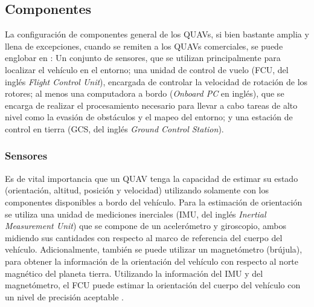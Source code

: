 \subsection{Componentes}

La configuración de componentes general de los QUAVs, si bien bastante amplia y llena de excepciones, cuando se remiten a los QUAVs comerciales, se puede englobar en \cite{multidrone2017review}: Un conjunto de sensores, que se utilizan principalmente para localizar el vehículo en el entorno; una unidad de control de vuelo (FCU, del inglés \textit{Flight Control Unit}), encargada de controlar la velocidad de rotación de los rotores; al menos una computadora a bordo (\textit{Onboard PC} en inglés), que se encarga de realizar el procesamiento necesario para llevar a cabo tareas de alto nivel como la evasión de obstáculos y el mapeo del entorno; y una estación de control en tierra (GCS, del inglés \textit{Ground Control Station}).

\subsubsection{Sensores}
\label{sec:QUAV-sensors}

Es de vital importancia que un QUAV tenga la capacidad de estimar su estado (orientación, altitud, posición y velocidad) utilizando solamente con los componentes disponibles a bordo del vehículo. Para la estimación de orientación se utiliza una unidad de mediciones inerciales \cite{multidrone2017review} (IMU, del inglés \textit{Inertial Measurement Unit}) que se compone de un acelerómetro y giroscopio, ambos midiendo sus cantidades con respecto al marco de referencia del cuerpo del vehículo. Adicionalmente, también se puede utilizar un magnetómetro (brújula), para obtener la información de la orientación del vehículo con respecto al norte magnético del planeta tierra. Utilizando la información del IMU y del magnetómetro, el FCU puede estimar la orientación del cuerpo del vehículo con un nivel de precisión aceptable \cite{multidrone2017review}. 


